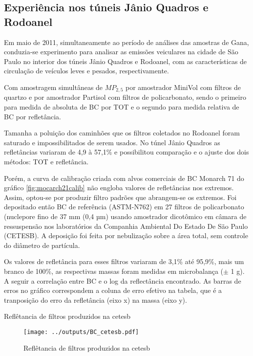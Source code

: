 \subsection{Experiência nos túneis Jânio Quadros e Rodoanel}

Em maio de 2011, simultaneamente ao período de análises das amostras de Gana,
conduzia-se experimento para analisar as emissões veiculares na cidade de São 
Paulo no interior dos túneis Jânio Quadros e Rodoanel, com as características
de circulação de veículos leves e pesados, respectivamente. 

Com amostragem simultâneas de $MP_{2,5}$ por amostrador MiniVol com 
filtros de quartzo e por amostrador Partisol com filtros de policarbonato, 
sendo o primeiro para medida de absoluta de BC por TOT e o segundo para medida
relativa de BC por refletância.

Tamanha a poluição dos caminhões que os filtros coletados no Rodoanel 
foram saturado e impossibilitados de serem usados. No túnel Jânio Quadros
as refletâncias variaram de 4,9 à 57,1\% e possibilitou comparação e o 
ajuste dos dois métodos: TOT e refletância.

Porém, a curva de calibração criada com alvos comerciais de BC Monarch 71
do gráfico \ref{fig:mocarch21calib} não engloba valores de refletâncias 
nos extremos.
Assim, optou-se por produzir filtro padrões que abrangem-se os extremos.   
Foi depositado então BC de referência (ASTM-N762) em 27 filtros de policarbonato
(nuclepore fino de 37 mm (0,4 µm) usando amostrador dicotômico em câmara de 
ressuspensão nos laboratórios da 
Companhia Ambiental Do Estado De São Paulo (CETESB). A deposição foi feita por 
nebulização sobre a área total, sem controle do diâmetro de partícula.

Os valores de refletância para esses filtros variaram de 3,1\% até 95,9\%, 
mais um branco de 100\%, as respectivas massas foram medidas em microbalança 
($\pm$ 1 g). A seguir a correlação entre BC e o log da reflectância encontrado.
As barras de erros no gráfico correspondem a coluna de erro efetivo na tabela, 
que é a tranposição do erro da refletância (eixo x) na massa (eixo y). 

\newpage
\begin{table}[H]
  \centering
  \small
    
    \caption{Reflêtancia de filtros produzidos na cetesb}
\end{table} 

\begin{figure}[H]
  \centering
  \texttt{[image: ../outputs/BC\_cetesb.pdf]}
  \caption{Reflêtancia de filtros produzidos na cetesb}
\end{figure}
\newpage

